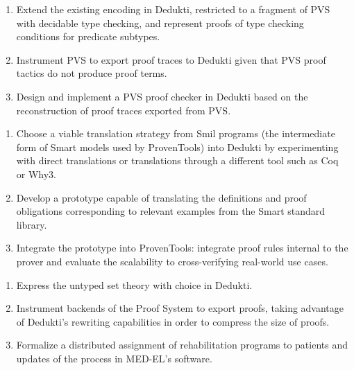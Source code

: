 \begin{workpackage}
\begin{tasklist}
\begin{task}[id=pvs,
  title=Express the theory of PVS in Dedukti,
  lead=Inr,   %
  InrRM=24,  %
  wphases=1-48,
  ]
  \begin{enumerate}
  \item Extend the existing encoding in Dedukti,
    restricted to a fragment of PVS with decidable type checking, and represent
    proofs of type checking conditions for predicate subtypes.
  \item Instrument PVS to export proof traces to Dedukti given that PVS proof
    tactics do not produce proof terms.
  \item Design and implement a PVS proof checker in Dedukti based on the
    reconstruction of proof traces exported from PVS.
  \end{enumerate}
\end{task}

\begin{task}[id=smart,
  title=Express \textsf{Smart} models and proofs in Dedukti,
  lead=Pro,   %
  ProRM=11,
  wphases=1-48,
  ]
  \begin{enumerate}
  \item Choose a viable translation strategy from \textsf{Smil} programs (the
    intermediate form of \textsf{Smart} models used by ProvenTools) into Dedukti
    by experimenting with direct translations or translations through a
    different tool such as Coq or Why3.
  \item Develop a prototype capable of translating the definitions and proof
    obligations corresponding to relevant examples from the \textsf{Smart}
    standard library.
  \item Integrate the prototype into ProvenTools: integrate proof rules internal
    to the prover and evaluate the scalability to cross-verifying real-world use
    cases.
  \end{enumerate}
\end{task}

\begin{task}[id=tla,
  title=Express the theory of \tlaplus in Dedukti,
  lead=Inr,   %
  InrRM=21,   %
  MedRM=4,
  wphases=1-48,
  ]
  \begin{enumerate}
  \item Express the untyped \tlaplus set theory with choice in
    Dedukti.
  \item Instrument backends of the \tlaplus Proof System to export proofs,
    taking advantage of Dedukti's rewriting capabilities in order to compress
    the size of proofs.
  \item Formalize a distributed assignment of rehabilitation programs to
    patients and updates of the process in MED-EL's software.
  \end{enumerate}
\end{task}


\end{tasklist}
\end{workpackage}
